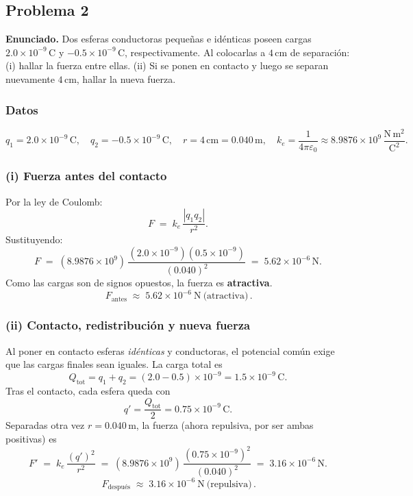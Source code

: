 \documentclass{article}
\begin{document}
\subsection{Problema 2} \vspace{0.5cm}

\textbf{Enunciado.} Dos esferas conductoras pequeñas e idénticas poseen cargas $2.0\times 10^{-9}\,\mathrm{C}$ y $-0.5\times 10^{-9}\,\mathrm{C}$, respectivamente. Al colocarlas a $4\,\mathrm{cm}$ de separación: (i) hallar la fuerza entre ellas. (ii) Si se ponen en contacto y luego se separan nuevamente $4\,\mathrm{cm}$, hallar la nueva fuerza.

\subsubsection*{Datos}
\[
q_1 = 2.0\times 10^{-9}\,\mathrm{C},\quad
q_2 = -0.5\times 10^{-9}\,\mathrm{C},\quad
r = 4\,\mathrm{cm}=0.040\,\mathrm{m},\quad
k_e=\frac{1}{4\pi\varepsilon_0}\approx 8.9876\times 10^9\,\frac{\mathrm{N\,m^2}}{\mathrm{C^2}}.
\]

\subsubsection*{(i) Fuerza antes del contacto}
Por la ley de Coulomb:
\[
F \;=\; k_e\,\frac{|q_1 q_2|}{r^2}.
\]
Sustituyendo:
\[
F \;=\; (8.9876\times 10^9)\,
\frac{(2.0\times 10^{-9})(0.5\times 10^{-9})}{(0.040)^2}
\;=\; 5.62\times 10^{-6}\,\mathrm{N}.
\]
Como las cargas son de signos opuestos, la fuerza es \textbf{atractiva}. \\
\[
\boxed{\,F_{\text{antes}} \;\approx\; 5.62\times 10^{-6}\ \mathrm{N}\ \text{(atractiva)}\,}.
\]

\subsubsection*{(ii) Contacto, redistribución y nueva fuerza}
Al poner en contacto esferas \emph{idénticas} y conductoras, el potencial común exige que las cargas finales sean iguales. La carga total es
\[
Q_{\text{tot}} = q_1+q_2 = (2.0-0.5)\times 10^{-9} = 1.5\times 10^{-9}\,\mathrm{C}.
\]
Tras el contacto, cada esfera queda con
\[
q' = \frac{Q_{\text{tot}}}{2} = 0.75\times 10^{-9}\,\mathrm{C}.
\]
Separadas otra vez $r=0.040\,\mathrm{m}$, la fuerza (ahora repulsiva, por ser ambas positivas) es
\[
F' \;=\; k_e\,\frac{(q')^2}{r^2}
\;=\; (8.9876\times 10^9)\,
\frac{(0.75\times 10^{-9})^2}{(0.040)^2}
\;=\; 3.16\times 10^{-6}\,\mathrm{N}.
\]
\[
\boxed{\,F_{\text{despu\'es}} \;\approx\; 3.16\times 10^{-6}\ \mathrm{N}\ \text{(repulsiva)}\,}.
\]
\end{document}
